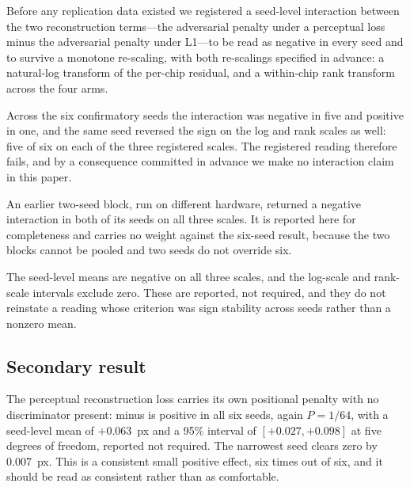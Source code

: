 Before any replication data existed we registered a seed-level interaction between the
two reconstruction terms---the adversarial penalty under a perceptual loss minus the
adversarial penalty under L1---to be read as negative in every seed and to
survive a monotone re-scaling, with both re-scalings specified in advance: a natural-log
transform of the per-chip residual, and a within-chip rank transform across the four arms.

Across the six confirmatory seeds the interaction was negative in five and
positive in one, and the same seed reversed the sign on the log and rank scales as well:
five of six on each of the three registered scales. The registered reading therefore
fails, and by a consequence committed in advance we make no interaction claim in this
paper.

An earlier two-seed block, run on different hardware, returned a negative interaction in
both of its seeds on all three scales. It is reported here for completeness and carries no
weight against the six-seed result, because the two blocks cannot be pooled and two seeds
do not override six.

The seed-level means are negative on all three scales, and the log-scale and rank-scale
intervals exclude zero. These are reported, not required, and they do not
reinstate a reading whose criterion was sign stability across seeds rather than a nonzero
mean.

\subsection{Secondary result}

The perceptual reconstruction loss carries its own positional penalty with no
discriminator present: \LPIPSonly{} minus \Lone{} is positive in all six seeds, again
$P = 1/64$, with a seed-level mean of $+0.063$~px and a 95\% interval of
$[+0.027, +0.098]$ at five degrees of freedom, reported not required. The narrowest
seed clears zero by 0.007~px. This is a consistent small positive effect, six times out
of six, and it should be read as consistent rather than as comfortable.

